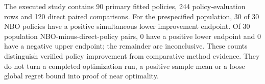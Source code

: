 The executed study contains 90 primary fitted policies, 244 policy-evaluation rows and 120 direct paired comparisons. For the prespecified population, 30 of 30 NBO policies have a positive simultaneous lower improvement endpoint. Of 30 population NBO-minus-direct-policy pairs, 0 have a positive lower endpoint and 0 have a negative upper endpoint; the remainder are inconclusive. These counts distinguish verified policy improvement from comparative method evidence. They do not turn a completed optimization run, a positive sample mean or a loose global regret bound into proof of near optimality.

